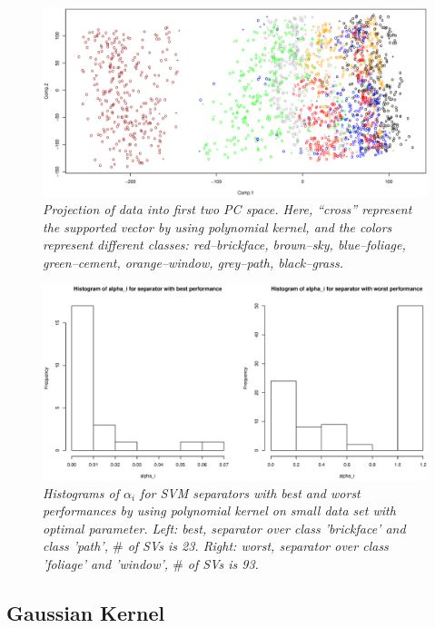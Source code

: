 \documentclass{article}
\begin{document}
\begin{figure}[htp]
\centering
\includegraphics[width=12.1cm]{small_svm_polynomial.eps}
\caption{\textit{Projection of data into first two PC space. Here, ``cross'' represent the supported vector by using polynomial kernel, and the colors represent different classes: red--brickface, brown--sky, blue--foliage, green--cement, orange--window, grey--path, black--grass.}}
\end{figure}

\begin{figure}[htp]
\centering
\includegraphics[width=12.1cm]{small_hist_polynomial.eps}
\caption{\textit{Histograms of $\alpha_{i}$ for SVM separators with best and worst performances by using polynomial kernel on small data set with optimal parameter. Left: best, separator over class 'brickface' and class 'path', $\#$ of SVs is 23. Right: worst, separator over class 'foliage' and 'window', $\#$ of SVs is 93.}}
\end{figure}

\goodbreak

\subsection{Gaussian Kernel}
\end{document}
